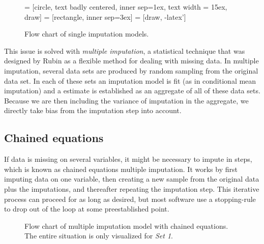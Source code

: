 \documentclass[headinclude=true, headsepline=true, DIV14]{scrartcl}\usepackage[]{graphicx}\usepackage[]{color}
\begin{document}
\begin{figure}
 = [circle, text badly centered, inner sep=1ex, text width = 15ex, draw]
 = [rectangle, inner sep=3ex]
 = [draw, -latex']

\centering
\small
{}
\caption{Flow chart of single imputation models.}
\label{fig:simput}
\end{figure}

This issue is solved with \emph{multiple imputation}, a statistical technique
that was designed by Rubin \cite{rubin_multiple_2004} as a flexible
method for dealing with missing data. In multiple imputation, several data sets
are produced by random sampling from the original data set. In each of these
sets an imputation model is fit (as in conditional mean imputation) and a
estimate is established as an aggregate of all of these data sets. Because we
are then including the variance of imputation in the aggregate, we directly
take bias from the imputation step into account.

\subsection{Chained equations}

If data is missing on several variables, it might be necessary to impute in
steps, which is known as chained equations multiple imputation. It works by
first imputing data on one variable, then creating a new sample from the
original data plus the imputations, and thereafter repeating the imputation
step. This iterative process can proceed for as long as desired, but most
software use a stopping-rule to drop out of the loop at some preestablished
point.

\begin{figure}[t]
\centering

\caption{Flow chart of multiple imputation model with chained equations. The
entire situation is only visualized for \emph{Set 1}.}
\label{fig:mimput}
\end{figure}
\end{document}
